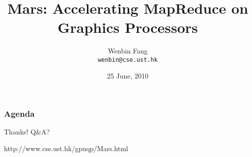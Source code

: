 \documentclass[24pt]{beamer}
\title{Mars: Accelerating MapReduce on Graphics Processors}
\author{Wenbin Fang \\ \texttt{wenbin@cse.ust.hk}}
\institute{HKUST}
\date{25 June, 2010}
\begin{document}
\begin{frame}
\titlepage
\end{frame}



\begin{frame}
\frametitle{Agenda}
\tableofcontents
\end{frame}











\begin{frame}
Thanks! Q\&A?

 
http://www.cse.ust.hk/gpuqp/Mars.html
\end{frame}


\end{document}

